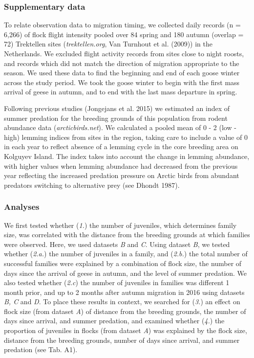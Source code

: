 \documentclass[10pt,twocolumn]{paper}
\begin{document}
\subsubsection{Supplementary data}\label{supplementary-data}

To relate observation data to migration timing, we collected daily
records (n = 6,266) of flock flight intensity pooled over 84 spring and
180 autumn (overlap = 72) Trektellen sites (\emph{trektellen.org}, Van
Turnhout et al. (2009)) in the Netherlands. We excluded flight activity
records from sites close to night roosts, and records which did not
match the direction of migration appropriate to the season. We used
these data to find the beginning and end of each goose winter across the
study period. We took the goose winter to begin with the first mass
arrival of geese in autumn, and to end with the last mass departure in
spring.

Following previous studies (Jongejans et al. 2015) we estimated an index
of summer predation for the breeding grounds of this population from
rodent abundance data (\emph{arcticbirds.net}). We calculated a pooled
mean of 0 - 2 (low - high) lemming indices from sites in the region,
taking care to include a value of 0 in each year to reflect absence of a
lemming cycle in the core breeding area on Kolguyev Island. The index
takes into account the change in lemming abundance, with higher values
when lemming abundance had decreased from the previous year reflecting
the increased predation pressure on Arctic birds from abundant predators
switching to alternative prey (see Dhondt 1987).

\subsubsection{Analyses}\label{analyses}

We first tested whether (\emph{1.}) the number of juveniles, which
determines family size, was correlated with the distance from the
breeding grounds at which families were observed. Here, we used datasets
\emph{B} and \emph{C}. Using dataset \emph{B}, we tested whether
(\emph{2.a.}) the number of juveniles in a family, and (\emph{2.b.}) the
total number of successful families were explained by a combination of
flock size, the number of days since the arrival of geese in autumn, and
the level of summer predation. We also tested whether (\emph{2.c}) the
number of juveniles in families was different 1 month prior, and up to 2
months after autumn migration in 2016 using datasets \emph{B, C} and
\emph{D}. To place these results in context, we searched for (\emph{3.})
an effect on flock size (from dataset \emph{A}) of distance from the
breeding grounds, the number of days since arrival, and summer
predation, and examined whether (\emph{4.}) the proportion of juveniles
in flocks (from dataset \emph{A}) was explained by the flock size,
distance from the breeding grounds, number of days since arrival, and
summer predation (see Tab. A1).
\end{document}

